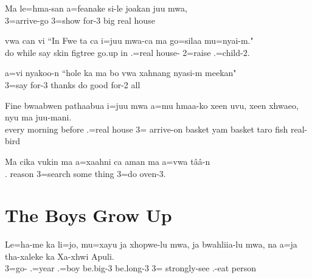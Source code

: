 \ea
\gll Ma le=hma-san a=feanake si-le joakan juu mwa,\\ 
      3=arrive-go 3=show for-3 big real house\\ 
     \glt {}
\z

\ea
\gll  vwa can vi ``In Fwe ta ca i=juu mwa-ca ma go=silaa mu=nyai-m."\\ 
    do while say skin figtree go.up in .=real house-  2=raise .=child-2.\\ 
    \glt {}
\z

\ea
\gll a=vi nyakoo-n ``hole ka ma bo vwa xahnang nyasi-m meekan"\\ 3=say for-3 thanks    do good for-2 all\\ \glt  {}
\z

\ea
\gll Fine bwaabwen pathaabua i=juu mwa a=mu hmaa-ko xeen uvu, xeen xhwaeo, nyu ma juu-mani.\\ 
    every morning before .=real house 3= arrive-on basket yam basket taro fish  real-bird\\ 
    \glt {}
\z

\ea
\gll Ma cika vukin ma a=xaahni ca aman ma a=vwa tââ-n\\  . reason  3=search some thing  3=do oven-3.\\ \glt  {}
\z

\section{The Boys Grow Up}
\ea
\gll Le=ha-me ka li=jo, mu=xayu ja xhopwe-lu mwa, ja bwahliia-lu mwa, na a=ja tha-xaleke ka Xa-xhwi Apuli.\\ 3=go-  .=year .=boy  be.big-3   be.long-3   3= strongly-see  .-eat person\\ \glt {}
\z

